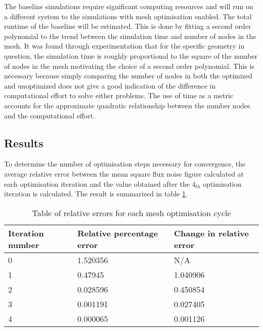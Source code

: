 The baseline simulations require significant computing resources and will run on a different system to the simulations with mesh optimisation enabled.
The total runtime of the baseline will be estimated. This is done by fitting a second order polynomial to the trend between the simulation time and number of nodes in the mesh. It was found through experimentation that for the specific geometry in question, the simulation time is roughly proportional to the square of the number of nodes in the mesh motivating the choice of a second order polynomial. This is necessary because simply comparing the number of nodes in both the optimized and unoptimized does not give a good indication of the difference in computational effort to solve either problems. The use of time as a metric accounts for the approximate quadratic relationship between the number nodes and the computational effort.

\subsection{Results}

To determine the number of optimisation steps necessary for convergence, the average relative error between the mean square flux noise figure calculated at each optimisation iteration and the value obtained after the $4_{th}$ optimisation iteration is calculated. The result is summarized in table \ref{tab:relerr}.


\begin{table}[H]
    \centering
    \begin{tabular}{lll}
    \hline
    Iteration number & Relative percentage error & Change in relative error \\ \hline
    0                & 1.520356                  & N/A                      \\
    1                & 0.47945                   & 1.040906                 \\
    2                & 0.028596                  & 0.450854                 \\
    3                & 0.001191                  & 0.027405                 \\
    4                & 0.000065                  & 0.001126                 \\ \hline         
    \end{tabular}
    \caption{Table of relative errors for each mesh optimisation cycle}
    \label{tab:relerr}
\end{table}

